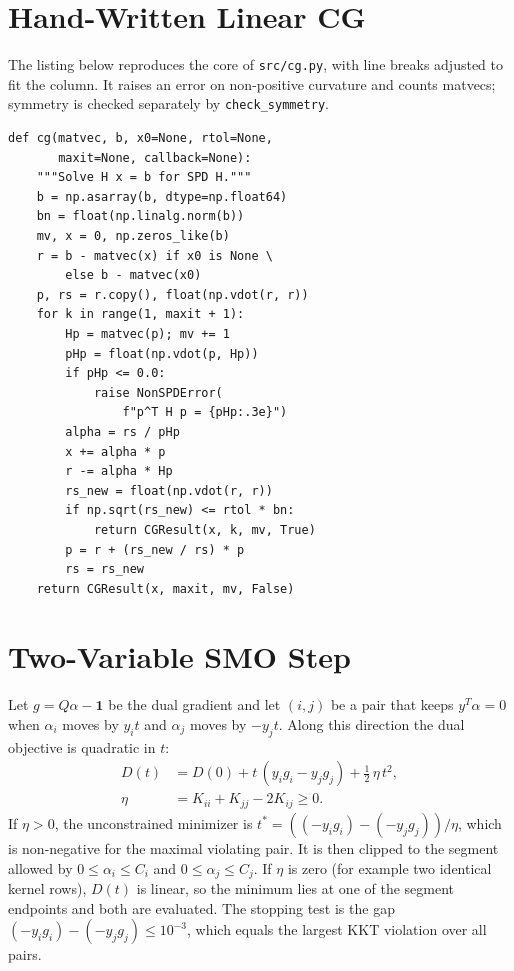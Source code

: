 \documentclass[conference,a4paper]{IEEEtran}
\begin{document}
\section{Hand-Written Linear CG}
The listing below reproduces the core of \texttt{src/cg.py}, with line breaks adjusted to fit the column. It raises an error on non-positive curvature and counts matvecs; symmetry is checked separately by \texttt{check\_symmetry}.

{\footnotesize
\begin{verbatim}
def cg(matvec, b, x0=None, rtol=None,
       maxit=None, callback=None):
    """Solve H x = b for SPD H."""
    b = np.asarray(b, dtype=np.float64)
    bn = float(np.linalg.norm(b))
    mv, x = 0, np.zeros_like(b)
    r = b - matvec(x) if x0 is None \
        else b - matvec(x0)
    p, rs = r.copy(), float(np.vdot(r, r))
    for k in range(1, maxit + 1):
        Hp = matvec(p); mv += 1
        pHp = float(np.vdot(p, Hp))
        if pHp <= 0.0:
            raise NonSPDError(
                f"p^T H p = {pHp:.3e}")
        alpha = rs / pHp
        x += alpha * p
        r -= alpha * Hp
        rs_new = float(np.vdot(r, r))
        if np.sqrt(rs_new) <= rtol * bn:
            return CGResult(x, k, mv, True)
        p = r + (rs_new / rs) * p
        rs = rs_new
    return CGResult(x, maxit, mv, False)
\end{verbatim}
}

\section{Two-Variable SMO Step}
Let $g=Q\alpha-\mathbf{1}$ be the dual gradient and let $(i,j)$ be a pair that keeps $y^{T}\alpha=0$ when $\alpha_i$ moves by $y_it$ and $\alpha_j$ moves by $-y_jt$. Along this direction the dual objective is quadratic in $t$:
\begin{equation}
\begin{split}
D(t)&=D(0)+t\,(y_ig_i-y_jg_j)+\tfrac12\,\eta\,t^2,\\
\eta&=K_{ii}+K_{jj}-2K_{ij}\ge0.
\end{split}
\end{equation}
If $\eta>0$, the unconstrained minimizer is $t^{*}=((-y_ig_i)-(-y_jg_j))/\eta$, which is non-negative for the maximal violating pair. It is then clipped to the segment allowed by $0\le\alpha_i\le C_i$ and $0\le\alpha_j\le C_j$. If $\eta$ is zero (for example two identical kernel rows), $D(t)$ is linear, so the minimum lies at one of the segment endpoints and both are evaluated. The stopping test is the gap $(-y_ig_i)-(-y_jg_j)\le10^{-3}$, which equals the largest KKT violation over all pairs.


\clearpage
\end{document}
